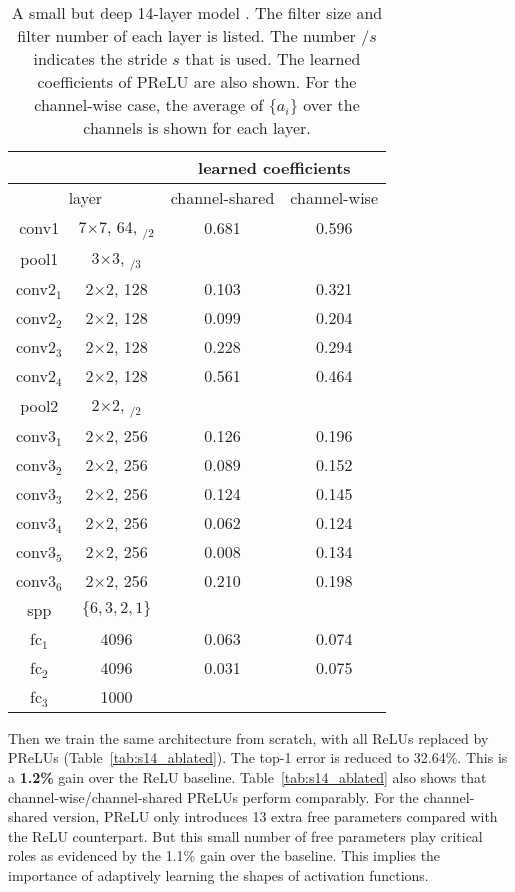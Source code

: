 \documentclass[10pt,twocolumn,letterpaper]{article}
\begin{document}
\setlength{\tabcolsep}{4pt}
\begin{table}[t]
\begin{center}
\footnotesize
\begin{tabular}{c c |c|c}
\hline
\multicolumn{2}{c|}{ } & \multicolumn{2}{c}{learned coefficients} \\
\hline
\multicolumn{2}{c|}{layer} &\footnotesize{channel-shared} & \footnotesize{channel-wise} \\
\hline
\hline
conv1 &  7$\times$7, 64, $_{/2}$ & 0.681 & 0.596 \\
\hline
pool1 &  3$\times$3, $_{/3}$ & & \\
\hline
conv2$_{1}$ &  2$\times$2, 128 & 0.103 & 0.321 \\
conv2$_{2}$ &  2$\times$2, 128 & 0.099 & 0.204 \\
conv2$_{3}$ &  2$\times$2, 128 & 0.228 & 0.294 \\
conv2$_{4}$ &  2$\times$2, 128 & 0.561 & 0.464 \\
\hline
pool2 &  2$\times$2, $_{/2}$ & & \\
\hline
conv3$_{1}$ &  2$\times$2, 256 & 0.126 & 0.196 \\
conv3$_{2}$ &  2$\times$2, 256 & 0.089 & 0.152 \\
conv3$_{3}$ &  2$\times$2, 256 & 0.124 & 0.145 \\
conv3$_{4}$ &  2$\times$2, 256 & 0.062 & 0.124 \\
conv3$_{5}$ &  2$\times$2, 256 & 0.008 & 0.134 \\
conv3$_{6}$ &  2$\times$2, 256 & 0.210 & 0.198 \\
\hline
spp &  $\{6,3,2,1\}$ & & \\
\hline
fc$_{1}$ &  4096 & 0.063 & 0.074 \\
fc$_{2}$ &  4096 & 0.031 & 0.075 \\
fc$_{3}$ &  1000 &       &       \\
\hline
\end{tabular}
\end{center}
\caption{A small but deep 14-layer model \cite{He2014a}. The filter size and filter number of each layer is listed. The number {/$s$} indicates the stride $s$ that is used.
The learned coefficients of PReLU are also shown. For the channel-wise case, the average of $\{a_i\}$ over the channels is shown for each layer.}
\label{tab:s14}
\end{table}

Then we train the same architecture from scratch, with all ReLUs replaced by PReLUs (Table~\ref{tab:s14_ablated}). The top-1 error is reduced to 32.64\%. This is a \textbf{1.2\%} gain over the ReLU baseline. Table~\ref{tab:s14_ablated} also shows that channel-wise/channel-shared PReLUs perform comparably. For the channel-shared version, PReLU only introduces 13 extra free parameters compared with the ReLU counterpart. But this small number of free parameters play critical roles as evidenced by the 1.1\% gain over the baseline. This implies the importance of adaptively learning the shapes of activation functions.
\end{document}
